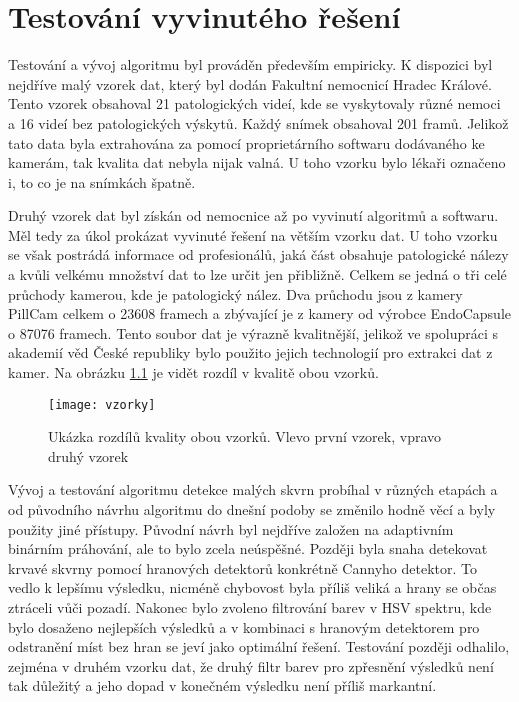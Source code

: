 \chapter{Testování vyvinutého řešení}
Testování a vývoj algoritmu byl prováděn především empiricky. K dispozici byl nejdříve malý vzorek dat, který byl dodán Fakultní nemocnicí Hradec Králové. Tento vzorek obsahoval 21 patologických videí, kde se vyskytovaly různé nemoci a 16 videí bez patologických výskytů. Každý snímek obsahoval 201 framů. Jelikož tato data byla extrahována za pomocí proprietárního softwaru dodávaného ke kamerám, tak kvalita dat nebyla nijak valná. U toho vzorku bylo lékaři označeno i, to co je na snímkách špatně.

Druhý vzorek dat byl získán od nemocnice až po vyvinutí algoritmů a softwaru. Měl tedy za úkol prokázat vyvinuté řešení na větším vzorku dat. U toho vzorku se však postrádá informace od profesionálů, jaká část obsahuje patologické nálezy a kvůli velkému množství dat to lze určit jen přibližně. Celkem se jedná o tři celé průchody kamerou, kde je patologický nález. Dva průchodu jsou z kamery PillCam celkem o 23608 framech a zbývající je z kamery od výrobce EndoCapsule o 87076 framech. Tento soubor dat je výrazně kvalitnější, jelikož ve spolupráci s akademií věd České republiky bylo použito jejich technologií pro extrakci dat z kamer. Na obrázku \ref{fig:vzorky} je vidět rozdíl v kvalitě obou vzorků.

\begin{figure}[h]
	\texttt{[image: vzorky]}
	\centering
	\caption{Ukázka rozdílů kvality obou vzorků. Vlevo první vzorek, vpravo druhý vzorek \label{fig:vzorky}}
\end{figure} 

Vývoj a testování algoritmu detekce malých skvrn probíhal v různých etapách a od původního návrhu algoritmu do dnešní podoby se změnilo hodně věcí a byly použity jiné přístupy. Původní návrh byl nejdříve založen na adaptivním binárním práhování, ale to bylo zcela neúspěšné. Později byla snaha detekovat krvavé skvrny pomocí hranových detektorů konkrétně Cannyho detektor. To vedlo k lepšímu výsledku, nicméně chybovost byla příliš veliká a hrany se občas ztráceli vůči pozadí. Nakonec bylo zvoleno filtrování barev v HSV spektru, kde bylo dosaženo nejlepších výsledků a v kombinaci s hranovým detektorem pro odstranění míst bez hran se jeví jako optimální řešení. Testování později odhalilo, zejména v druhém vzorku dat, že druhý filtr barev pro zpřesnění výsledků není tak důležitý a jeho dopad v konečném výsledku není příliš markantní.


